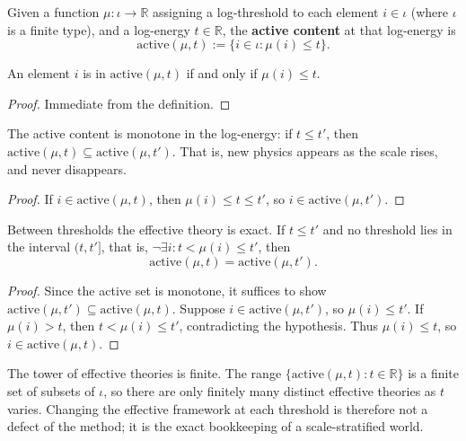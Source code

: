 \begin{definition}
Given a function $\mu : \iota \to \mathbb{R}$ assigning a log-threshold to each element $i \in \iota$ (where $\iota$ is a finite type), and a log-energy $t \in \mathbb{R}$, the \textbf{active content} at that log-energy is
\begin{equation}
\text{active}(\mu, t) := \{i \in \iota : \mu(i) \leq t\} .
\end{equation}
\end{definition}

\begin{theorem}
An element $i$ is in $\text{active}(\mu, t)$ if and only if $\mu(i) \leq t$.
\end{theorem}

\begin{proof}
Immediate from the definition.
\end{proof}

\begin{theorem}
The active content is monotone in the log-energy: if $t \leq t'$, then $\text{active}(\mu, t) \subseteq \text{active}(\mu, t')$. That is, new physics appears as the scale rises, and never disappears.
\end{theorem}

\begin{proof}
If $i \in \text{active}(\mu, t)$, then $\mu(i) \leq t \leq t'$, so $i \in \text{active}(\mu, t')$.
\end{proof}

\begin{theorem}
Between thresholds the effective theory is exact. If $t \leq t'$ and no threshold lies in the interval $(t, t']$, that is, $\neg \exists i : t < \mu(i) \leq t'$, then
\begin{equation}
\text{active}(\mu, t) = \text{active}(\mu, t') .
\end{equation}
\end{theorem}

\begin{proof}
Since the active set is monotone, it suffices to show $\text{active}(\mu, t') \subseteq \text{active}(\mu, t)$. Suppose $i \in \text{active}(\mu, t')$, so $\mu(i) \leq t'$. If $\mu(i) > t$, then $t < \mu(i) \leq t'$, contradicting the hypothesis. Thus $\mu(i) \leq t$, so $i \in \text{active}(\mu, t)$.
\end{proof}

\begin{theorem}
The tower of effective theories is finite. The range $\{\text{active}(\mu, t) : t \in \mathbb{R}\}$ is a finite set of subsets of $\iota$, so there are only finitely many distinct effective theories as $t$ varies. Changing the effective framework at each threshold is therefore not a defect of the method; it is the exact bookkeeping of a scale-stratified world.
\end{theorem}

